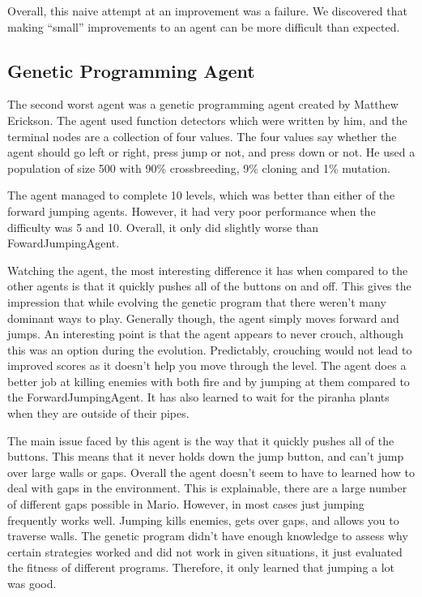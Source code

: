 \documentclass[12pt]{article}
\begin{document}
\begin{multicols*}{2}
Overall, this naive attempt at an improvement was a failure.  We discovered that making ``small'' 
improvements to an agent can be more difficult than expected.

\subsection*{Genetic Programming Agent}
The second worst agent was a genetic programming agent created by Matthew Erickson.  
The agent used function detectors which were written by him, and the terminal nodes are a 
collection of four values.  The four values say whether the agent should go left or right, 
press jump or not, and press down or not.  He used a population of size 500 with 90\% 
crossbreeding, 9\% cloning and 1\% mutation.

The agent managed to complete 10 levels, which was better than either of the forward jumping 
agents.  However, it had very poor performance when the difficulty was 5 and 10.  Overall, it only 
did slightly worse than FowardJumpingAgent.

Watching the agent, the most interesting difference it has when compared to the other agents is 
that it quickly pushes all of the buttons on and off.  This gives the impression that while evolving 
the genetic program that there weren't many dominant ways to play.  Generally though, the agent 
simply moves forward and jumps.  An interesting point is that the agent appears to never crouch, 
although this was an option during the evolution.  Predictably, crouching would not lead to improved 
scores as it doesn't help you move through the level.  
The agent does a better job at killing enemies with both 
fire and by jumping at them compared to the ForwardJumpingAgent.  
It has also learned to wait for the piranha plants when they are outside 
of their pipes.

The main issue faced by this agent is the way that it quickly pushes all of the buttons.  This means that 
it never holds down the jump button, and can't jump over large walls or gaps.  Overall the agent 
doesn't seem to have to learned how to deal with gaps in the environment.  This is explainable, there 
are a large number of different gaps possible in Mario.  However, in most cases just jumping frequently 
works well.    Jumping kills enemies, gets over gaps, and allows you to traverse walls.  
The genetic program didn't have enough knowledge to assess why certain strategies 
worked and did not work in given situations, it just evaluated the fitness of different programs.  
Therefore, it only learned that jumping a lot was good.


\end{multicols*}
\end{document}
